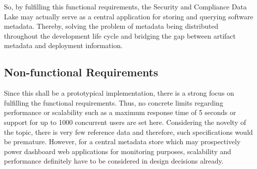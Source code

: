 So, by fulfilling this functional requirements, the Security and Compliance Data Lake may actually serve as a central application for storing and querying software metadata. Thereby, solving the problem of metadata being distributed throughout the development life cycle and bridging the gap between artifact metadata and deployment information.

\subsection{Non-functional Requirements}
Since this shall be a prototypical implementation, there is a strong focus on fulfilling the functional requirements. Thus, no concrete limits regarding performance or scalability such as a maximum response time of 5 seconds or support for up to 1000 concurrent users are set here. Considering the novelty of the topic, there is very few reference data and therefore, such specifications would be premature. However, for a central metadata store which may prospectively power dashboard web applications for monitoring purposes, scalability and performance definitely have to be considered in design decisions already.

